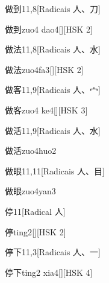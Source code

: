 \begin{entry}{做到}{11,8}[Radicais ⼈、⼑]
  \begin{phonetics}{做到}{zuo4 dao4}[][HSK 2]
  \end{phonetics}
\end{entry}

\begin{entry}{做法}{11,8}[Radicais ⼈、⽔]
  \begin{phonetics}{做法}{zuo4fa3}[][HSK 2]
  \end{phonetics}
\end{entry}

\begin{entry}{做客}{11,9}[Radicais ⼈、⼧]
  \begin{phonetics}{做客}{zuo4 ke4}[][HSK 3]
  \end{phonetics}
\end{entry}

\begin{entry}{做活}{11,9}[Radicais ⼈、⽔]
  \begin{phonetics}{做活}{zuo4huo2}
  \end{phonetics}
\end{entry}

\begin{entry}{做眼}{11,11}[Radicais ⼈、⽬]
  \begin{phonetics}{做眼}{zuo4yan3}
  \end{phonetics}
\end{entry}

\begin{entry}{停}{11}[Radical ⼈]
  \begin{phonetics}{停}{ting2}[][HSK 2]
  \end{phonetics}
\end{entry}

\begin{entry}{停下}{11,3}[Radicais ⼈、⼀]
  \begin{phonetics}{停下}{ting2 xia4}[][HSK 4]
  \end{phonetics}
\end{entry}

